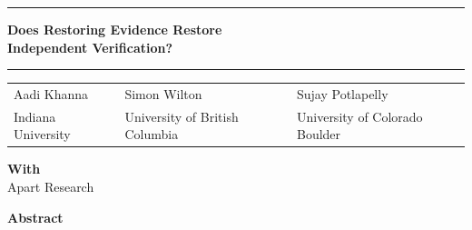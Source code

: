 \documentclass[12pt,letterpaper]{article}
\begin{document}
\begin{center}
\rule{\linewidth}{2pt}\par\vspace{10pt}
{\fontsize{20}{23}\selectfont\bfseries Does Restoring Evidence Restore\\Independent Verification?\par}
\vspace{10pt}\rule{\linewidth}{0.5pt}\par\vspace{10pt}
\begin{tabularx}{\linewidth}{@{}>{\centering\arraybackslash}X>{\centering\arraybackslash}X>{\centering\arraybackslash}X@{}}
Aadi Khanna & Simon Wilton & Sujay Potlapelly\\
\small Indiana University & \small University of British Columbia & \small University of Colorado Boulder
\end{tabularx}
\vspace{8pt}\par
{\small\textbf{With}\\Apart Research}\par
\vspace{10pt}
{\large\bfseries Abstract}
\end{center}
\begin{quote}\small

\end{quote}





\label{main-text-end}
\clearpage


\clearpage
\appendix

\end{document}

